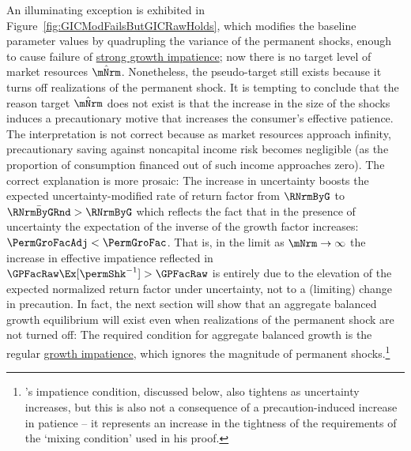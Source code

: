 \documentclass[\econtexRoot/BufferStockTheory]{subfiles}
\begin{document}
\renewcommand{\figFile}{GICModFailsButGICRawHolds}
\hypertarget{\figFile}{}


An illuminating exception is exhibited in Figure~\ref{fig:GICModFailsButGICRawHolds}, which modifies the baseline parameter values by quadrupling the variance of the permanent shocks, enough to cause failure of \hyperlink{GICMod}{strong growth impatience}; now there is no target level of market resources $\mTrgNrm$.
Nonetheless, the pseudo-target still exists because it turns off realizations of the permanent shock.
It is tempting to conclude that the reason target $\mTrgNrm$ does not exist is that the increase in the size of the shocks induces a precautionary motive that increases the consumer's effective patience.
The interpretation is not correct because as market resources approach infinity, precautionary saving against noncapital income risk becomes negligible (as the proportion of consumption financed out of such income approaches zero).
\hypertarget{PermGroFacAdj}{}The correct explanation is more prosaic: The increase in uncertainty boosts the expected uncertainty-modified rate of return factor from $\RNrmByG$ to $\bar{\RNrmByGRnd}>\RNrmByG$ which reflects the fact that in the presence of uncertainty the expectation of the inverse of the growth factor increases: $\PermGroFacAdj < \PermGroFac$.
That is, in the limit as $\mNrm \rightarrow \infty$ the increase in effective impatience reflected in $\GPFacMod > \GPFacRaw$ is entirely due to the elevation of the expected normalized return factor under uncertainty, not to a (limiting) change in precaution.
In fact, the next section will show that an aggregate balanced growth equilibrium will exist even when realizations of the permanent shock are not turned off: The required condition for aggregate balanced growth is the regular \hyperlink{GICRaw}{growth impatience}, which ignores the magnitude of permanent shocks.\footnote{\cite{szeidlInvariant}'s impatience condition, discussed below, also tightens as uncertainty increases, but this is also not a consequence of a precaution-induced increase in patience -- it represents an increase in the tightness of the requirements of the `mixing condition' used in his proof.}
\end{document}
